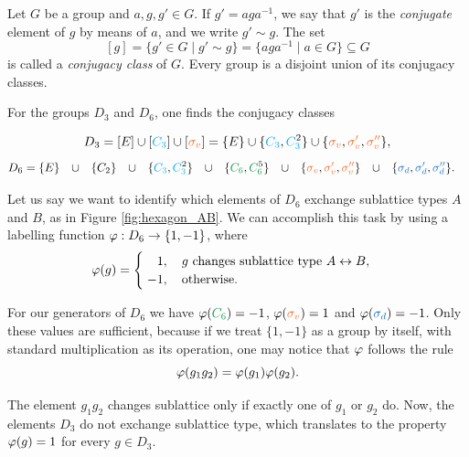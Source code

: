 \begin{definition}
Let $G$ be a group and $a, g, g' \in G$. If $g' = a g a^{-1}$, we say that $g'$ is the \textit{conjugate} element of $g$ by means of $a$, and we write $g' \sim g$. The set
$$
[g] = \{ g' \in G \mid g' \sim g \} = \{ a g a^{-1} \mid a \in G \} \subseteq G
$$
is called a \textit{conjugacy class} of $G$. Every group is a disjoint union of its conjugacy classes.
\end{definition}

\begin{example}
For the groups $D_3$ and $D_6$, one finds the conjugacy classes

\begin{equation} \label{eq:D3_classes}
D_3 = [E] \cup [\Ct] \cup [\sv] = \{E\} \cup \{\Ct, \Ctn{2}\} \cup \{\sv, \svp, \svpp\},
\end{equation}
\begin{align} \label{eq:D6_classes}
D_6 &= \{E\} &&\cup&& \{C_2\} &&\cup&& \{\Ct, \Ctn{2}\} &&\cup&& \{\Cs, \Csn{5}\} &&\cup&& \{\sv, \svp, \svpp\} &&\cup&& \{\sd, \sdp, \sdpp\}.
\end{align}
\end{example}

\begin{example}
Let us say we want to identify which elements of $D_6$ exchange sublattice types $A$ and $B$, as in Figure \ref{fig:hexagon_AB}. We can accomplish this task by using a labelling function $\varphi: D_6 \to \{1, -1\}$, where
\begin{align*}
\vphi(g) =
\begin{cases}
\; \P1, \quad g \text{ changes sublattice type } A \leftrightarrow B, \\
\; -1, \quad \text{otherwise.}
\end{cases}
\end{align*}

For our generators of $D_6$ we have $\vphi(\Cs) = -1$, $\vphi(\sv) = 1$ and $\vphi(\sd) = -1$. Only these values are sufficient, because if we treat $\{1, -1\}$ as a group by itself, with standard multiplication as its operation, one may notice that $\varphi$ follows the rule
$$
\varphi(g_1 g_2) = \varphi(g_1) \varphi(g_2).
$$

The element $g_1 g_2$ changes sublattice only if exactly one of $g_1$ or $g_2$ do. Now, the elements $D_3$ do not exchange sublattice type, which translates to the property $\varphi(g) = 1$ for every $g \in D_3$.
\end{example}

